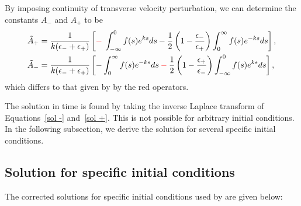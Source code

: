 By imposing continuity of transverse velocity perturbation, we can determine the constants $A_-$ and $A_+$ to be
\begin{align}
\tilde{A}_+ & = \frac{1}{k(\epsilon_- + \epsilon_+)}\left[\textcolor{red}{-} \: \int_{-\infty}^0 f(s)e^{ks} ds - \frac{1}{2}\left(1 - \frac{\epsilon_-}{\epsilon_+}\right)\int_0^\infty f(s)e^{-ks} ds\right], \\
\tilde{A}_- & = \frac{1}{k(\epsilon_- + \epsilon_+)}\left[-\int_0^\infty f(s)e^{-ks} ds \: \textcolor{red}{-} \: \frac{1}{2}\left(1 - \frac{\epsilon_+}{\epsilon_-}\right)\int_{-\infty}^0 f(s)e^{ks} ds\right],
\end{align}
which differs to that given by \cite{rae_etal81} by the red operators.

The solution in time is found by taking the inverse Laplace transform of Equations~\eqref{sol -} and~\eqref{sol +}. This is not possible for arbitrary initial conditions. In the following subsection, we derive the solution for several specific initial conditions.


\subsection{Solution for specific initial conditions}

The corrected solutions for specific initial conditions used by \cite{rae_etal81} are given below:

